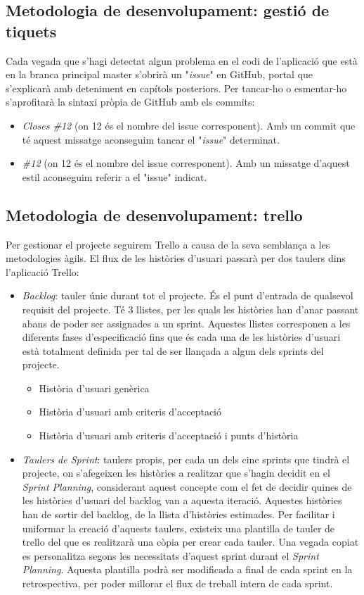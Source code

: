 \subsection{Metodologia de desenvolupament: gestió de tiquets}
Cada vegada que s'hagi detectat algun problema en el codi de l'aplicació que està en la branca principal master s'obrirà un "\textit{issue}" en GitHub, portal que s'explicarà amb deteniment en capítols posteriors. Per tancar-ho o esmentar-ho s'aprofitarà la sintaxi pròpia de GitHub amb els commits:
\begin{itemize}
\item \textit{Closes \#12} (on 12 és el nombre del issue corresponent). Amb un commit que té aquest missatge aconseguim tancar el "\textit{issue}" determinat.
\item \textit{\#12} (on 12 és el nombre del issue corresponent). Amb un missatge d'aquest estil aconseguim referir a el "issue" indicat.
\end{itemize}

\subsection{Metodologia de desenvolupament: trello}
Per gestionar el projecte seguirem Trello a causa de la seva semblança a les metodologies àgils. El flux de les històries d'usuari passarà per dos taulers dins l'aplicació Trello:
\begin{itemize}
\item \textit{Backlog}: tauler únic durant tot el projecte. És el punt d'entrada de qualsevol requisit del projecte. Té 3 llistes, per les quals les històries han d'anar passant abans de poder ser assignades a un sprint. Aquestes llistes corresponen a les diferents fases d'especificació fins que és cada una de les històries d'usuari està totalment definida per tal de ser llançada a algun dels sprints del projecte.
\begin{itemize}
\item Història d'usuari genèrica
\item Història d'usuari amb criteris d'acceptació
\item Història d'usuari amb criteris d'acceptació i punts d'història
\end{itemize}
\item \textit{Taulers de Sprint}: taulers propis, per cada un dels cinc sprints que tindrà el projecte, on s'afegeixen les històries a realitzar que s'hagin decidit en el \textit{Sprint Planning}, considerant aquest concepte com el fet de decidir quines de les històries d'usuari del backlog van a aquesta iteració. Aquestes històries han de sortir del backlog, de la llista d'històries estimades. Per facilitar i uniformar la creació d'aquests taulers, existeix una plantilla de tauler de trello del que es realitzarà una còpia per crear cada tauler. Una vegada copiat es personalitza segons les necessitats d'aquest sprint durant el \textit{Sprint Planning}. Aquesta plantilla podrà ser modificada a final de cada sprint en la retrospectiva, per poder millorar el flux de treball intern de cada sprint.
\end{itemize}

